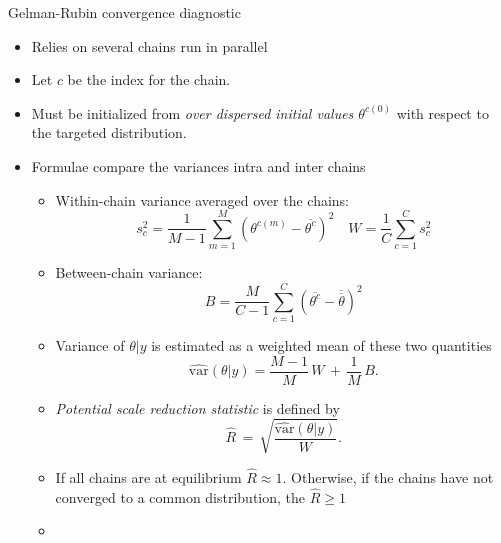 \begin{frame}{Gelman-Rubin convergence diagnostic}
\begin{itemize}
 \item Relies on several chains run in parallel
 \item Let $c$ be the index for the chain. 
  \item Must be initialized from \emph{over dispersed initial values $\theta^{c(0)}$} with respect to the targeted distribution. 
  \item Formulae compare the variances intra and inter chains
   \begin{itemize}
  \item Within-chain variance  averaged over the chains:
  $$s^2_c = \frac{1}{M-1}\sum_{m=1}^M (\theta^{c(m)}- \overline{\theta^{c}})^2 \quad W = \frac{1}{C}\sum_{c=1}^C s^2_c$$
  \item Between-chain variance:  $$B = \frac{M}{C-1} \sum_{c = 1}^C (\overline{\theta^{c}} - \overline{\overline{\theta}})^2$$  
  \item Variance of $\theta | y$ is estimated as a weighted mean of these two quantities
  $$\widehat{\mbox{var}}\!(\theta|y)
= \frac{M-1}{M}\, W \, + \, \frac{1}{M} \, B.$$ 
\item \emph{Potential scale reduction statistic} is defined by
$$\hat{R}
\, = \,
\sqrt{\frac{\widehat{\mbox{var}}\!(\theta|y)}{W}}.$$

\item If all chains are at equilibrium $\hat{R} \approx 1$. Otherwise, if the chains have not converged to a common distribution, the  
$\hat{R} \geq 1$
\item {}
\end{itemize}
\end{itemize}
\end{frame}
